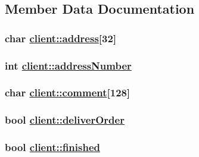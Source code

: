 \subsection{Member Data Documentation}
\hypertarget{classclient_06a8d016fa013b9fc60bcc24da937701}{
\subsubsection[address]{\setlength{\rightskip}{0pt plus 5cm}char \hyperlink{classclient_06a8d016fa013b9fc60bcc24da937701}{client::address}\mbox{[}32\mbox{]}}}
\label{classclient_06a8d016fa013b9fc60bcc24da937701}


\hypertarget{classclient_6ab3066cc6893cf6833b2871ecdebaf2}{
\subsubsection[addressNumber]{\setlength{\rightskip}{0pt plus 5cm}int \hyperlink{classclient_6ab3066cc6893cf6833b2871ecdebaf2}{client::address\-Number}}}
\label{classclient_6ab3066cc6893cf6833b2871ecdebaf2}


\hypertarget{classclient_34824e2772f77c71f2d3778354d68b1c}{
\subsubsection[comment]{\setlength{\rightskip}{0pt plus 5cm}char \hyperlink{classclient_34824e2772f77c71f2d3778354d68b1c}{client::comment}\mbox{[}128\mbox{]}}}
\label{classclient_34824e2772f77c71f2d3778354d68b1c}


\hypertarget{classclient_48e3b11844a6747c24de0ff69018f775}{
\subsubsection[deliverOrder]{\setlength{\rightskip}{0pt plus 5cm}bool \hyperlink{classclient_48e3b11844a6747c24de0ff69018f775}{client::deliver\-Order}}}
\label{classclient_48e3b11844a6747c24de0ff69018f775}


\hypertarget{classclient_a5d7ceb2c59b8cee46c2953fec9abc19}{
\subsubsection[finished]{\setlength{\rightskip}{0pt plus 5cm}bool \hyperlink{classclient_a5d7ceb2c59b8cee46c2953fec9abc19}{client::finished}}}
\label{classclient_a5d7ceb2c59b8cee46c2953fec9abc19}


